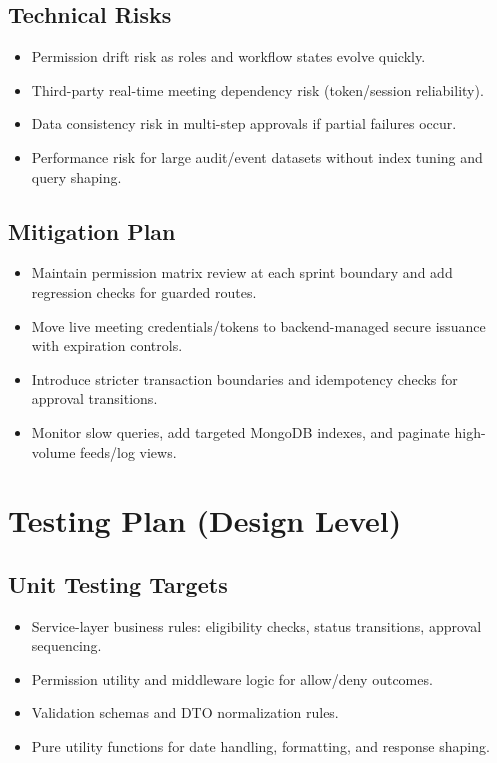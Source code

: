 \documentclass[12pt,a4paper]{article}
\begin{document}
\subsection{Technical Risks}

\begin{itemize}[noitemsep]
  \item Permission drift risk as roles and workflow states evolve quickly.
  \item Third-party real-time meeting dependency risk (token/session reliability).
  \item Data consistency risk in multi-step approvals if partial failures occur.
  \item Performance risk for large audit/event datasets without index tuning and query shaping.
\end{itemize}

\subsection{Mitigation Plan}

\begin{itemize}[noitemsep]
  \item Maintain permission matrix review at each sprint boundary and add regression checks for guarded routes.
  \item Move live meeting credentials/tokens to backend-managed secure issuance with expiration controls.
  \item Introduce stricter transaction boundaries and idempotency checks for approval transitions.
  \item Monitor slow queries, add targeted MongoDB indexes, and paginate high-volume feeds/log views.
\end{itemize}

\section{Testing Plan (Design Level)}

\subsection{Unit Testing Targets}

\begin{itemize}[noitemsep]
  \item Service-layer business rules: eligibility checks, status transitions, approval sequencing.
  \item Permission utility and middleware logic for allow/deny outcomes.
  \item Validation schemas and DTO normalization rules.
  \item Pure utility functions for date handling, formatting, and response shaping.
\end{itemize}
\end{document}
